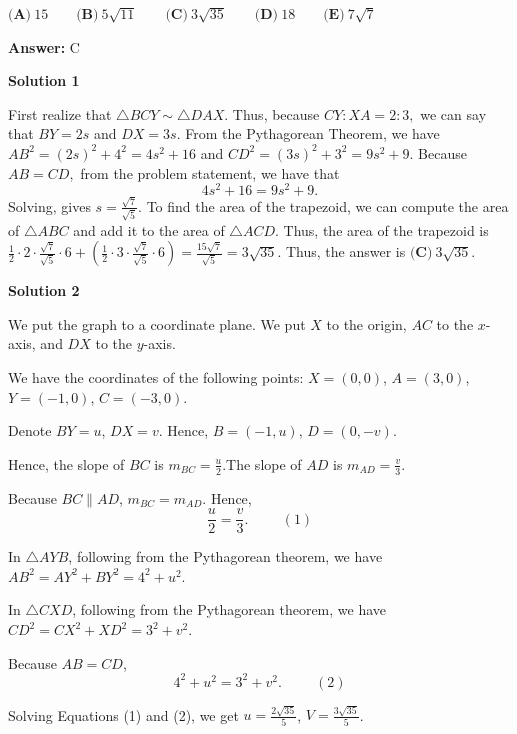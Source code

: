 \begin{enumerate}
$\textbf{(A)}\: 15\qquad\textbf{(B)} \: 5\sqrt{11}\qquad\textbf{(C)} \: 3\sqrt{35}\qquad\textbf{(D)} \: 18\qquad\textbf{(E)} \: 7\sqrt{7}$

 \textbf{Answer: }C



\textbf{Solution 1}

First realize that $\triangle BCY \sim \triangle DAX.$ Thus, because $CY: XA = 2:3,$ we can say that $BY = 2s$ and $DX = 3s.$ From the Pythagorean Theorem, we have $AB^2 =(2s)^2 + 4^2 = 4s^2 + 16$ and $CD^2 = (3s)^2 + 3^2 = 9s^2 + 9.$ Because $AB = CD,$ from the problem statement, we have that 
 \[4s^2 + 16 = 9s^2 + 9.\] Solving, gives $s = \frac{\sqrt{7}}{\sqrt{5}}.$ To find the area of the trapezoid, we can compute the area of $\triangle ABC$ and add it to the area of $\triangle ACD.$ Thus, the area of the trapezoid is $\frac{1}{2} \cdot 2 \cdot \frac{\sqrt{7}}{\sqrt{5}} \cdot 6 + \left(\frac{1}{2} \cdot 3 \cdot \frac{\sqrt{7}}{\sqrt{5}} \cdot 6 \right) = \frac{15\sqrt{7}}{\sqrt{5}} = 3\sqrt{35}.$ Thus, the answer is $\boxed{\textbf{(C)} \: 3\sqrt{35}}.$




\textbf{Solution 2}

We put the graph to a coordinate plane. We put $X$ to the origin, $AC$ to the $x$-axis, and $DX$ to the $y$-axis.

 We have the coordinates of the following points: $X = \left( 0 , 0 \right)$, $A = \left( 3 , 0 \right)$, $Y = \left( - 1 , 0 \right)$, $C = \left( - 3 , 0 \right)$.

 Denote $BY = u$, $DX = v$. Hence, $B = \left( - 1 , u \right)$, $D = \left( 0 , - v \right)$.

 Hence, the slope of $BC$ is $m_{BC} = \frac{u}{2}$.The slope of $AD$ is $m_{AD} = \frac{v}{3}$.

 Because $BC \parallel AD$, $m_{BC} = m_{AD}$. Hence,
 \[ \frac{u}{2} = \frac{v}{3} . \hspace{1cm} (1) \]

 In $\triangle AYB$, following from the Pythagorean theorem, we have $AB^2 = AY^2 + BY^2 = 4^2 + u^2$.

 In $\triangle CXD$, following from the Pythagorean theorem, we have $CD^2 = CX^2 + XD^2 = 3^2 + v^2$.

 Because $AB = CD$,
 \[ 4^2 + u^2 = 3^2 + v^2 . \hspace{1cm} (2) \]

 Solving Equations (1) and (2), we get $u = \frac{2 \sqrt{35}}{5}$, $V = \frac{3 \sqrt{35}}{5}$.


\end{enumerate}
